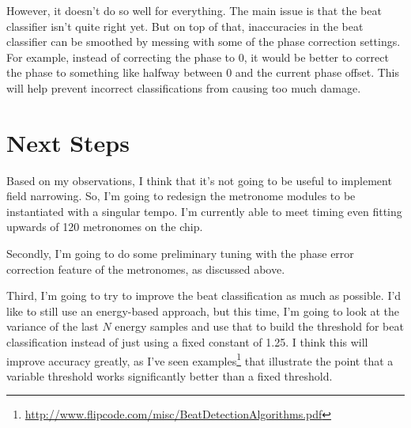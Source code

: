 \documentclass[letterpaper]{article}
\begin{document}
However, it doesn't do so well for everything.  The main issue is that the beat
classifier isn't quite right yet.  But on top of that, inaccuracies in the beat
classifier can be smoothed by messing with some of the phase correction
settings.  For example, instead of correcting the phase to 0, it would be
better to correct the phase to something like halfway between 0 and the current
phase offset.  This will help prevent incorrect classifications from causing
too much damage.


\section{Next Steps}

Based on my observations, I think that it's not going to be useful to implement
field narrowing.  So, I'm going to redesign the metronome modules to be
instantiated with a singular tempo.  I'm currently able to meet timing even
fitting upwards of 120 metronomes on the chip.

Secondly, I'm going to do some preliminary tuning with the phase error
correction feature of the metronomes, as discussed above.

Third, I'm going to try to improve the beat classification as much as possible.
I'd like to still use an energy-based approach, but this time, I'm going to
look at the variance of the last $N$ energy samples and use that to build the
threshold for beat classification instead of just using a fixed constant of
1.25.  I think this will improve accuracy greatly, as I've seen
examples\footnote{\url{http://www.flipcode.com/misc/BeatDetectionAlgorithms.pdf}}
that illustrate the point that a variable threshold works significantly better
than a fixed threshold. 
\end{document}
